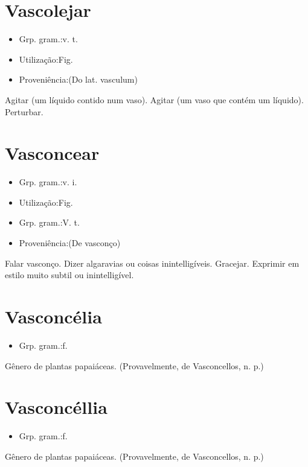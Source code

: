 \documentclass{article}
\begin{document}
\section{Vascolejar}
\begin{itemize}
\item {Grp. gram.:v. t.}
\end{itemize}
\begin{itemize}
\item {Utilização:Fig.}
\end{itemize}
\begin{itemize}
\item {Proveniência:(Do lat. \textunderscore vasculum\textunderscore )}
\end{itemize}
Agitar (um líquido contido num vaso).
Agitar (um vaso que contém um líquido).
Perturbar.
\section{Vasconcear}
\begin{itemize}
\item {Grp. gram.:v. i.}
\end{itemize}
\begin{itemize}
\item {Utilização:Fig.}
\end{itemize}
\begin{itemize}
\item {Grp. gram.:V. t.}
\end{itemize}
\begin{itemize}
\item {Proveniência:(De \textunderscore vasconço\textunderscore )}
\end{itemize}
Falar vasconço.
Dizer algaravias ou coisas inintelligíveis.
Gracejar.
Exprimir em estilo muito subtil ou inintelligível.
\section{Vasconcélia}
\begin{itemize}
\item {Grp. gram.:f.}
\end{itemize}
Gênero de plantas papaiáceas.
(Provavelmente, de \textunderscore Vasconcellos\textunderscore , n. p.)
\section{Vasconcéllia}
\begin{itemize}
\item {Grp. gram.:f.}
\end{itemize}
Gênero de plantas papaiáceas.
(Provavelmente, de \textunderscore Vasconcellos\textunderscore , n. p.)
\end{document}
